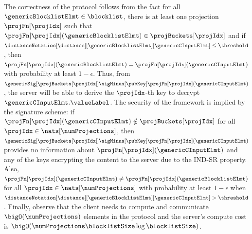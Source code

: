 The correctness of the 
protocol follows from the fact for all $\genericBlocklistElmt \in \blocklist$, there is at least one 
projection $\projFn[\projIdx]$ such that $\projFn[\projIdx](\genericBlocklistElmt) \in 
\projBuckets[\projIdx]$ and if 
$\distanceNotation[\distance][\genericBlocklistElmt][\genericCInputElmt] \le \threshold$, 
then $\projFn[\projIdx](\genericBlocklistElmt) = \projFn[\projIdx](\genericCInputElmt)$ with 
probability at least $1 - \epsilon$. Thus, from 
$\genericSig[\projBuckets[\projIdx]]\sigMinus[\pubKey]\projFn[\projIdx](\genericCInputElmt)$,
the server will be able to derive the $\projIdx$-th key to decrypt $\genericCInputElmt.\valueLabel$. 
The security of  the framework is implied by the signature scheme: if 
$\projFn[\projIdx](\genericCInputElmt) \notin \projBuckets[\projIdx]$ for all $\projIdx \in 
\nats[\numProjections]$, then 
$\genericSig[\projBuckets[\projIdx]]\sigMinus[\pubKey] 
\projFn[\projIdx](\genericCInputElmt)$ provides no information about 
$\projFn[\projIdx](\genericCInputElmt)$ and any of the keys 
encrypting the content to the server due to the IND-SR property. Also, 
$\projFn[\projIdx](\genericCInputElmt) \neq \projFn[\projIdx](\genericBlocklistElmt)$ for all 
$\projIdx \in \nats[\numProjections]$ with probability at least $1 - \epsilon$ when  
$\distanceNotation[\distance][\genericBlocklistElmt][\genericCInputElmt] > \threshold$. 
Finally, observe that the client needs to compute and communicate $\bigO(\numProjections)$ 
elements in the protocol and the server's compute cost is $\bigO(\numProjections \blocklistSize 
\log\blocklistSize)$. 


